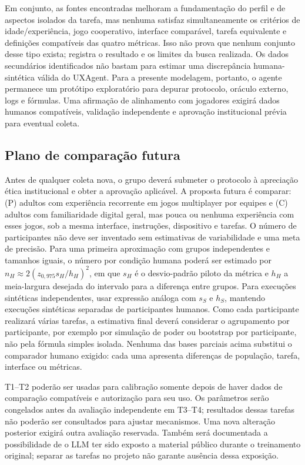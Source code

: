 \documentclass[conference]{IEEEtran}
\begin{document}
Em conjunto, as fontes encontradas melhoram a fundamentação do perfil e de aspectos isolados da tarefa, mas nenhuma satisfaz simultaneamente os critérios de idade/experiência, jogo cooperativo, interface comparável, tarefa equivalente e definições compatíveis das quatro métricas. Isso não prova que nenhum conjunto desse tipo exista; registra o resultado e os limites da busca realizada. Os dados secundários identificados não bastam para estimar uma discrepância humana-sintética válida do UXAgent. Para a presente modelagem, portanto, o agente permanece um protótipo exploratório para depurar protocolo, oráculo externo, logs e fórmulas. Uma afirmação de alinhamento com jogadores exigirá dados humanos compatíveis, validação independente e aprovação institucional prévia para eventual coleta.

\subsection{Plano de comparação futura}

Antes de qualquer coleta nova, o grupo deverá submeter o protocolo à apreciação ética institucional e obter a aprovação aplicável. A proposta futura é comparar: (P) adultos com experiência recorrente em jogos multiplayer por equipes e (C) adultos com familiaridade digital geral, mas pouca ou nenhuma experiência com esses jogos, sob a mesma interface, instruções, dispositivo e tarefas. O número de participantes não deve ser inventado sem estimativas de variabilidade e uma meta de precisão. Para uma primeira aproximação com grupos independentes e tamanhos iguais, o número por condição humana poderá ser estimado por $n_H \approx 2(z_{0,975}s_H/h_H)^2$, em que $s_H$ é o desvio-padrão piloto da métrica e $h_H$ a meia-largura desejada do intervalo para a diferença entre grupos. Para execuções sintéticas independentes, usar expressão análoga com $s_S$ e $h_S$, mantendo execuções sintéticas separadas de participantes humanos. Como cada participante realizará várias tarefas, a estimativa final deverá considerar o agrupamento por participante, por exemplo por simulação de poder ou bootstrap por participante, não pela fórmula simples isolada. Nenhuma das bases parciais acima substitui o comparador humano exigido: cada uma apresenta diferenças de população, tarefa, interface ou métricas.

T1--T2 poderão ser usadas para calibração somente depois de haver dados de comparação compatíveis e autorização para seu uso. Os parâmetros serão congelados antes da avaliação independente em T3--T4; resultados dessas tarefas não poderão ser consultados para ajustar mecanismos. Uma nova alteração posterior exigirá outra avaliação reservada. Também será documentada a possibilidade de o LLM ter sido exposto a material público durante o treinamento original; separar as tarefas no projeto não garante ausência dessa exposição.
\end{document}
